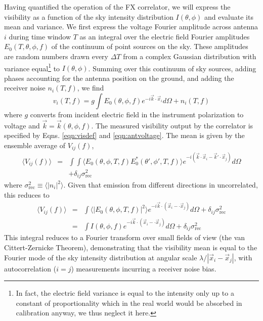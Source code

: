 Having quantified the operation of the FX correlator, we will express the visibility as a function of the sky intensity distribution $I(\theta,\phi)$ and evaluate its mean and variance. We first express the voltage Fourier amplitude across antenna $i$ during time window $T$ as an integral over the electric field Fourier amplitudes $E_0(T,\theta,\phi,f)$ of the continuum of point sources on the sky. These amplitudes are random numbers drawn every $\Delta T$ from a complex Gaussian distribution with variance equal\footnote{In fact, the electric field variance is equal to the intensity only up to a constant of proportionality which in the real world would be absorbed in calibration anyway, we thus neglect it here.} to $I(\theta,\phi)$. Summing over this continuum of sky sources, adding phases accounting for the antenna position on the ground, and adding the receiver noise $n_i(T,f)$, we find
\begin{equation}
\label{eqn:antvoltage}
v_i(T,f) = g\int E_0(\theta,\phi,f)e^{-i\vec{k}\cdot \vec{x}_i}d\Omega+n_i(T,f)
\end{equation}
where $g$ converts from incident electric field in the instrument polarization to voltage and $\vec{k}=\vec{k}(\theta,\phi,f)$. The measured visibility output by the correlator is specified by Eqns. \ref{eqn:visdef} and \ref{eqn:antvoltage}. The mean is given by the ensemble average of $V_{ij}(f)$,
\begin{eqnarray}
\langle V_{ij}(f)\rangle &=&\int\int \langle E_0(\theta,\phi,T,f)E_0^*(\theta',\phi',T,f)\rangle e^{-i(\vec{k}\cdot\vec{x}_i-\vec{k}'\cdot\vec{x}_j)}d\Omega \nonumber \\ 
&&+\delta_{ij}\sigma_\text{rec}^2
\end{eqnarray}
where $\sigma_\text{rec}^2\equiv\langle |n_i|^2\rangle$. Given that emission from different directions in uncorrelated, this reduces to 
\begin{eqnarray}
\label{eqn:vismean}
\langle V_{ij}(f)\rangle &=&\int\langle |E_0(\theta,\phi,T,f)|^2\rangle e^{-i\vec{k}\cdot(\vec{x}_i-\cdot\vec{x}_j)}d\Omega+\delta_{ij}\sigma_\text{rec}^2 \\
&=&\int I(\theta,\phi,f) e^{-i\vec{k}\cdot(\vec{x}_i-\cdot\vec{x}_j)}d\Omega+\delta_{ij}\sigma_\text{rec}^2 
\end{eqnarray}
This integral reduces to a Fourier transform over small fields of view (the van Cittert-Zernicke Theorem), demonstrating that the visibility mean is equal to the Fourier mode of the sky intensity distribution at angular scale $\lambda/|\vec{x}_i-\vec{x}_j|$, with autocorrelation ($i=j$) measurements incurring a receiver noise bias.

